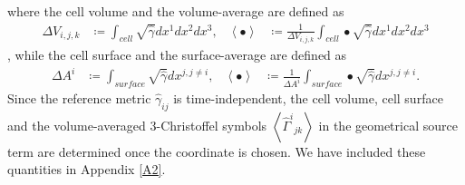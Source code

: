 where the cell volume and the volume-average are defined as
\begin{align}
    \Delta V_{i,j,k} &\coloneqq \int_{cell} \sqrt{\hat{\gamma}} dx^1 dx^2 dx^3, &
    \left\langle \bullet \right\rangle &\coloneqq \frac{1}{\Delta V_{i,j,k}} \int_{cell} \bullet \sqrt{\hat{\gamma}} dx^1 dx^2 dx^3
\end{align},
while the cell surface and the surface-average are defined as
\begin{align}
    \Delta A^i &\coloneqq \int_{surface} \sqrt{\hat{\gamma}} dx^{j,j\neq i}, &
    \left\langle \bullet \right\rangle &\coloneqq \frac{1}{\Delta A^i} \int_{surface} \bullet \sqrt{\hat{\gamma}} dx^{j,j\neq i}.
\end{align}
Since the reference metric $\hat{\gamma}_{ij}$ is time-independent,
the cell volume, cell surface and the volume-averaged 3-Christoffel symbols
$\left\langle \hat{\Gamma}^i{}_{jk} \right\rangle$ in the geometrical source term
are determined once the coordinate is chosen.
We have included these quantities in Appendix \ref{A2}.

